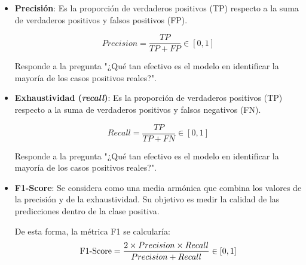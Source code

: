 \begin{itemize}
    La principal ventaja de esta métrica es que proporciona una medida simple y fácilmente interpretable de qué tan bien el modelo está clasificando las instancias.

    Sin embargo, cuando las clases en el conjunto de datos están desbalanceadas, es decir, hay muchas más instancias en una clase que en otras, o cuando el coste de fallar cada clase es distinto, la \textit{accuracy} puede ser engañosa. Un modelo que predice siempre la clase mayoritaria puede tener una alta \textit{accuracy} simplemente debido al desbalance de clases, pero este modelo no sería útil en la práctica.


    \item \textbf{Precisión}: Es la proporción de verdaderos positivos (TP) respecto a la suma de verdaderos positivos y falsos positivos (FP).
     
    $$
    Precision = \frac{TP}{TP+FP} \in \left[0,1\right]
    $$

    Responde a la pregunta "¿Qué tan efectivo es el modelo en identificar la mayoría de los casos positivos reales?".


    \item \textbf{Exhaustividad (\textit{recall})}: Es la proporción de verdaderos positivos (TP) respecto a la suma de verdaderos positivos y falsos negativos (FN).
     
    $$
    Recall = \frac{TP}{TP+FN} \in \left[0,1\right]
    $$

    Responde a la pregunta "¿Qué tan efectivo es el modelo en identificar la mayoría de los casos positivos reales?".

    
    \item \textbf{F1-Score}: Se considera como una media armónica que combina los valores de la precisión y de la exhaustividad. Su objetivo es medir la calidad de las predicciones dentro de la clase positiva. 

    De esta forma, la métrica F1 se calcularía:
    $$
    \textnormal{F1-Score} = \frac{2 \times Precision \times Recall}{Precision+Recall} \in \left[0,1\right]
    $$


\end{itemize}
